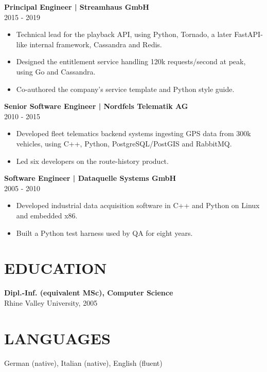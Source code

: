 \documentclass[11pt,a4paper]{article}
\newcommand{\cvsection}[1]{\section*{#1}}
\newcommand{\cvrole}[2]{\Needspace{7\baselineskip}\noindent\textbf{#1}\\#2\par}
\begin{document}
\cvrole{Principal Engineer | Streamhaus GmbH}{2015 - 2019}
\begin{itemize}
\item Technical lead for the playback API, using Python, Tornado, a later FastAPI-like internal framework, Cassandra and Redis.
\item Designed the entitlement service handling 120k requests/second at peak, using Go and Cassandra.
\item Co-authored the company's service template and Python style guide.
\end{itemize}
\cvrole{Senior Software Engineer | Nordfels Telematik AG}{2010 - 2015}
\begin{itemize}
\item Developed fleet telematics backend systems ingesting GPS data from 300k vehicles, using C++, Python, PostgreSQL/PostGIS and RabbitMQ.
\item Led six developers on the route-history product.
\end{itemize}
\cvrole{Software Engineer | Dataquelle Systems GmbH}{2005 - 2010}
\begin{itemize}
\item Developed industrial data acquisition software in C++ and Python on Linux and embedded x86.
\item Built a Python test harness used by QA for eight years.
\end{itemize}
\cvsection{EDUCATION}
\textbf{Dipl.-Inf. (equivalent MSc), Computer Science}\\
Rhine Valley University, 2005
\cvsection{LANGUAGES}
German (native), Italian (native), English (fluent)
\end{document}
